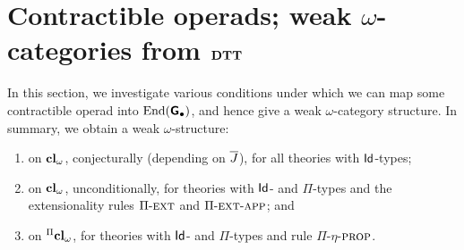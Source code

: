 





 


















\section{Contractible operads; weak $\omega$-categories from $\mathbf{DTT}$} \label{sec:contractibility}



 In this section, we investigate various conditions under which we can map some contractible operad into $\mathrm{End}(\textsf{\textbf{G}}_\bullet)$, and hence give a weak $\omega$-category structure.  In summary, we obtain a weak $\omega$-structure:
\begin{enumerate}
\item on $\mathbf{cl}_\omega$, conjecturally (depending on $\overline{J}$), for all theories with $\mathsf{Id}$-types;
\item on $\mathbf{cl}_\omega$, unconditionally, for theories with $\mathsf{Id}$- and $\Pi$-types and the extensionality rules ${\Pi\mbox{-}\textsc{ext}}$ and ${\Pi\mbox{-}\textsc{ext}\mbox{-}\textsc{app}}$; and
\item on ${}^\Pi \mathbf{cl}_\omega$, for theories with $\mathsf{Id}$- and $\Pi$-types and rule $\Pi$-$\eta$-$\textsc{prop}$.
\end{enumerate}

